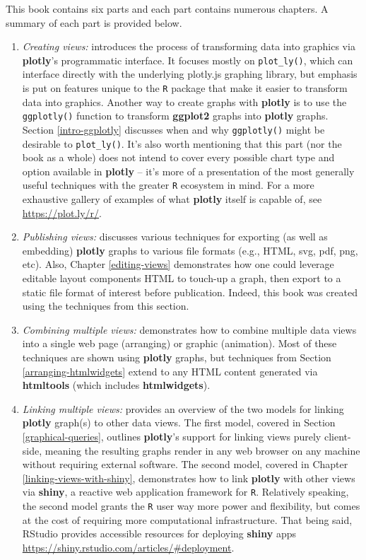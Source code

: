 \documentclass[
  12pt,
]{krantz}
\begin{document}
This book contains six parts and each part contains numerous chapters. A summary of each part is provided below.

\begin{enumerate}
\def\labelenumi{\arabic{enumi}.}
\item
  \emph{Creating views:} introduces the process of transforming data into graphics via \textbf{plotly}'s programmatic interface. It focuses mostly on \texttt{plot\_ly()}, which can interface directly with the underlying plotly.js graphing library, but emphasis is put on features unique to the \texttt{R} package that make it easier to transform data into graphics. Another way to create graphs with \textbf{plotly} is to use the \texttt{ggplotly()} function to transform \textbf{ggplot2} graphs into \textbf{plotly} graphs. Section \ref{intro-ggplotly} discusses when and why \texttt{ggplotly()} might be desirable to \texttt{plot\_ly()}. It's also worth mentioning that this part (nor the book as a whole) does not intend to cover every possible chart type and option available in \textbf{plotly} -- it's more of a presentation of the most generally useful techniques with the greater \texttt{R} ecosystem in mind. For a more exhaustive gallery of examples of what \textbf{plotly} itself is capable of, see \url{https://plot.ly/r/}.
\item
  \emph{Publishing views:} discusses various techniques for exporting (as well as embedding) \textbf{plotly} graphs to various file formats (e.g., HTML, svg, pdf, png, etc). Also, Chapter \ref{editing-views} demonstrates how one could leverage editable layout components HTML to touch-up a graph, then export to a static file format of interest before publication. Indeed, this book was created using the techniques from this section.
\item
  \emph{Combining multiple views:} demonstrates how to combine multiple data views into a single web page (arranging) or graphic (animation). Most of these techniques are shown using \textbf{plotly} graphs, but techniques from Section \ref{arranging-htmlwidgets} extend to any HTML content generated via \textbf{htmltools} (which includes \textbf{htmlwidgets}).
\item
  \emph{Linking multiple views:} provides an overview of the two models for linking \textbf{plotly} graph(s) to other data views. The first model, covered in Section \ref{graphical-queries}, outlines \textbf{plotly}'s support for linking views purely client-side, meaning the resulting graphs render in any web browser on any machine without requiring external software. The second model, covered in Chapter \ref{linking-views-with-shiny}, demonstrates how to link \textbf{plotly} with other views via \textbf{shiny}, a reactive web application framework for \texttt{R}. Relatively speaking, the second model grants the \texttt{R} user way more power and flexibility, but comes at the cost of requiring more computational infrastructure. That being said, RStudio provides accessible resources for deploying \textbf{shiny} apps \url{https://shiny.rstudio.com/articles/\#deployment}.

\end{enumerate}
\end{document}
